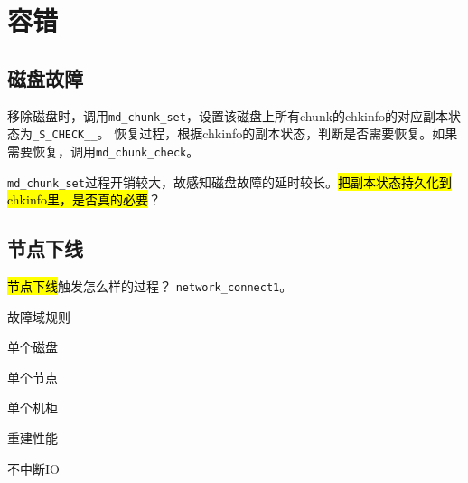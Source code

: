 \chapter{容错}

\section{磁盘故障}

移除磁盘时，调用\verb|md_chunk_set|，设置该磁盘上所有chunk的chkinfo的对应副本状态为\verb|_S_CHECK__|。
恢复过程，根据chkinfo的副本状态，判断是否需要恢复。如果需要恢复，调用\verb|md_chunk_check|。

\verb|md_chunk_set|过程开销较大，故感知磁盘故障的延时较长。\hl{把副本状态持久化到chkinfo里，是否真的必要}？

\section{节点下线}

\hl{节点下线}触发怎么样的过程？ \verb|network_connect1|。



故障域规则

单个磁盘

单个节点

单个机柜

重建性能

不中断IO
